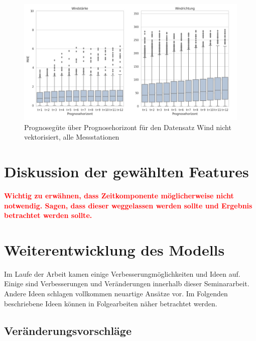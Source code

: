 \documentclass[
12pt, %
toc=listofnumbered, %
toc=chapterentrydotfill, %
numbers=noenddot, %
captions=tableheading, %
bibliography=numbered
]{scrreprt}
\let\Oldsection\section
\renewcommand{\section}{\FloatBarrier\Oldsection}
\let\Oldsubsection\subsection
\renewcommand{\subsection}{\FloatBarrier\Oldsubsection}
\newcommand{\qm}[1]{\glqq#1\grqq{}} %
\newcommand{\highlight}[1]{\textbf{\textcolor{red}{#1}}}
\begin{document}
\begin{figure}[tph]
	\begin{center}
		\includegraphics[width=\linewidth]{./images/Güte über Prognosehorizont sd direkt-cropped.jpg}
		\caption{Prognosegüte über Prognosehorizont für den Datensatz \qm{Wind nicht vektorisiert, alle Messstationen}}
		\label{fig:güte_über_zeit_sd_all}
	\end{center}
\end{figure}

\section{Diskussion der gewählten Features}
\highlight{Wichtig zu erwähnen, dass Zeitkomponente möglicherweise nicht notwendig. Sagen, dass dieser weggelassen werden sollte und Ergebnis betrachtet werden sollte.}

\section{Weiterentwicklung des Modells}

Im Laufe der Arbeit kamen einige Verbesserungmöglichkeiten und Ideen auf. Einige sind Verbesserungen und Veränderungen innerhalb dieser Seminararbeit. 
Andere Ideen schlagen vollkommen neuartige Ansätze vor. Im Folgenden beschriebene Ideen können in Folgearbeiten näher betrachtet werden.

\subsection{Veränderungsvorschläge}
\end{document}
